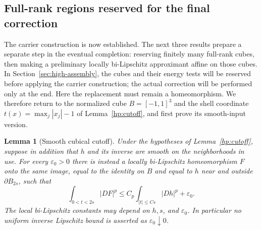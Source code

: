 \documentclass[11pt]{article}
\numberwithin{equation}{section}
\newtheorem{lemma}[theorem]{Lemma}
\theoremstyle{definition}
\theoremstyle{remark}
\begin{document}
\subsection{Full-rank regions reserved for the final correction}

The carrier construction is now established.  The next three results
prepare a separate step in the eventual completion: reserving finitely many full-rank cubes, then making a
preliminary locally bi-Lipschitz approximant affine on those cubes.
In Section~\ref{sec:high-assembly}, the cubes and their energy tests
will be reserved before applying the carrier construction; the actual
correction will be performed only at the end.  Here the replacement must remain a homeomorphism.  We therefore return
to the normalized cube $B=[-1,1]^3$ and the shell coordinate
$t(x)=\max_j|x_j|-1$ of Lemma~\ref{hp:cutoff}, and first prove its
smooth-input version.

\begin{lemma}[Smooth cubical cutoff]\label{hp:smooth-cutoff}
Under the hypotheses of Lemma~\ref{hp:cutoff}, suppose in addition
that $h$ and its inverse are smooth on the neighborhoods in use.
For every $\varepsilon_0>0$ there is instead a locally bi-Lipschitz
homeomorphism $F$ onto the same image, equal to the identity on $B$
and equal to $h$ near and outside $\partial B_{2s}$, such that
\begin{equation}\label{hp:smooth-cutoff-energy}
 \int_{0<t<2s}|DF|^p
 \leq C_p\int_{|t|\leq Cs}|Dh|^p+\varepsilon_0.
\end{equation}
The local bi-Lipschitz constants may depend on $h,s$, and
$\varepsilon_0$.  In particular no uniform inverse Lipschitz bound
is asserted as $\varepsilon_0\downarrow0$.
\end{lemma}
\end{document}
